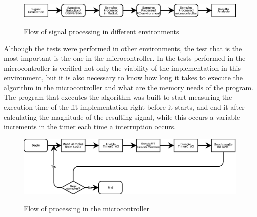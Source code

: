 \begin{figure}[]
    \centering
    \includegraphics[width=1\textwidth]{Chapters/6CHP/Figures/ProcFlow.eps}
    \caption{Flow of signal processing in different environments}{}
    \label{fig:flowProc}
\end{figure}
Although the tests were performed in other environments, the test that is the most important is the one in the microcontroller. In the tests performed in the microcontroller is verified not only the viability of the implementation in this environment, but it is also necessary to know how long it takes to execute the algorithm in the microcontroller and what are the memory needs of the program. The program that executes the algorithm was built to start measuring the execution time of the \acrshort{fft} implementation right before it starts, and end it after calculating the magnitude of the resulting signal, while this occurs a variable increments in the timer each time a interruption occurs.
\begin{figure}[]
    \centering
    \includegraphics[width=1\textwidth]{Chapters/6CHP/Figures/uCDataProc.eps}
    \caption{Flow of processing in the microcontroller}{}
    \label{fig:dataProcuC}
\end{figure}
